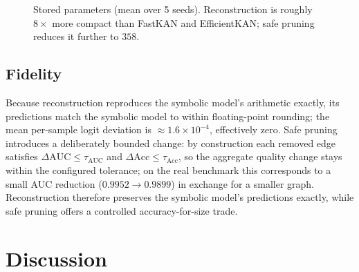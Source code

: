 \documentclass[conference]{IEEEtran}
\begin{document}
\begin{figure}[t]
\centering
{}
\caption{Stored parameters (mean over 5 seeds). Reconstruction is roughly
$8\times$ more compact than FastKAN and EfficientKAN; safe pruning reduces it
further to $358$.}
\label{fig:params}
\end{figure}

\subsection{Fidelity}

Because reconstruction reproduces the symbolic model's arithmetic exactly, its
predictions match the symbolic model to within floating-point rounding; the
mean per-sample logit deviation is $\approx 1.6\times10^{-4}$, effectively
zero. Safe pruning introduces a deliberately bounded change: by construction
each removed edge satisfies $\Delta\mathrm{AUC}\le\tau_{\mathrm{AUC}}$ and
$\Delta\mathrm{Acc}\le\tau_{\mathrm{Acc}}$, so the aggregate quality change
stays within the configured tolerance; on the real benchmark this corresponds
to a small AUC reduction ($0.9952\to0.9899$) in exchange for a smaller graph.
Reconstruction therefore preserves the symbolic model's predictions exactly,
while safe pruning offers a controlled accuracy-for-size trade.

\section{Discussion}
\end{document}
